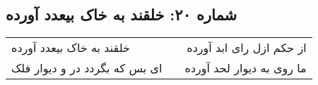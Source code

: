 \begin{center}
\section*{شماره ۲۰: خلقند به خاک بیعدد آورده}
\label{sec:020}
\begin{longtable}{l p{0.5cm} r}
خلقند به خاک بیعدد آورده
&&
از حکم ازل رای ابد آورده
\\
ای بس که بگردد در و دیوار فلک
&&
ما روی به دیوار لحد آورده
\\
\end{longtable}
\end{center}
